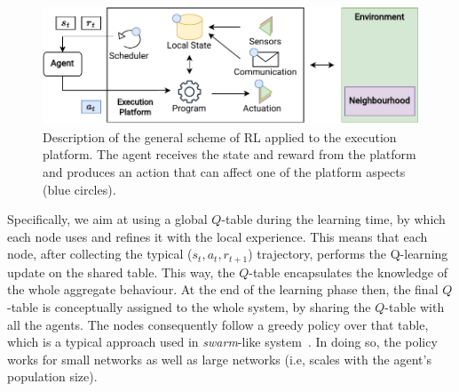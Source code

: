 \begin{figure}
	\centering
    \includegraphics[width=\linewidth]{papers/acsos2022/img//rl-architecture.pdf}
    \caption[Description of the general scheme of \ac{RL} applied to the execution platform.]{Description of the general scheme of \ac{RL} applied to the execution platform. 
    The agent receives the state and reward from the platform and produces an action that can affect one of the platform aspects (blue circles).}
    \label{acsos2022:fig:rl-and-ac}
\end{figure}
Specifically, we aim at using a global $Q$-table during the learning time, 
 by which each node uses and refines it with the local experience.
This means that each node, after collecting the typical ($s_t, a_t, r_{t+1}$) trajectory,
 performs the Q-learning update on the shared table.
%
 This way, the $Q$-table encapsulates the knowledge of the whole aggregate behaviour.
%
At the end of the learning phase then, 
 the final $Q$-table is conceptually assigned to the whole system, by sharing the $Q$-table with all the agents.
%
 The nodes consequently follow a greedy policy over that table, 
 which is a typical approach used in \emph{swarm}-like system~\cite{DBLP:journals/jmlr/HuttenrauchSN19, DBLP:conf/atal/SosicKZK17}.
%
In doing so, the policy works for small networks as well as large networks  (i.e, scales with the agent's population size).

